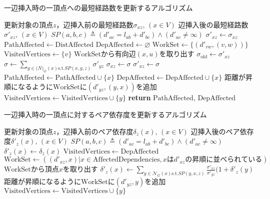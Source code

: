 \begin{algorithm}[H]
  \caption{一辺挿入時の一頂点への最短経路数を更新するアルゴリズム}
  \label{algo:update-sigma-on-insert}
  \begin{algorithmic}[1]
    \Require 更新対象の頂点$z$，辺挿入前の最短経路数$\sigma_{xz},\,(x\in V)$
    \Ensure 辺挿入後の最短経路数$\sigma'_{xz},\,(x\in V)$
    \State $SP(a,b,c)\triangleq(d'_{ac}=l_{ab}+d'_{bc})\land(d'_{ac}\neq\infty)$
    \State $\sigma'_{xz}\gets\sigma_{xz}$
    \State $\mathrm{PathAffected}\gets\mathrm{DistAffected}$
    \State $\mathrm{DepAffected}\gets\varnothing$
    \State $\mathrm{WorkSet}\gets\{(d'_{vw}, (v, w))\}$
    \State $\mathrm{VisitedVertices}\gets\{v\}$
    \State $\mathrm{WorkSet}$から有向辺$(x,u)$を取り出す
    \State $\sigma_{\mathrm{old}}\gets\sigma'_{xz}$
    \State $\sigma\gets\sum_{y\in \mathcal(N)_G(x)\mathrm{s.t.}SP(x,y,z)}\sigma'_{yz}$
    \State $\sigma_{xz}\gets\sigma$
    \State $\sigma'_{xz}\gets\sigma$
    \State $\mathrm{PathAffected}\gets\mathrm{PathAffected}\cup\{x\}$
    \State $\mathrm{DepAffected}\gets\mathrm{DepAffected}\cup\{x\}$
    \State 距離が昇順になるように$\mathrm{WorkSet}$に$(d'_{yz},(y,x))$を追加
    \State $\mathrm{VisitedVertices}\gets\mathrm{VisitedVertices}\cup\{y\}$
    \EndFor
    \EndIf
    \EndWhile
    \State \textbf{return} $\mathrm{PathAffected}$, $\mathrm{DepAffected}$
    \EndProcedure
  \end{algorithmic}
\end{algorithm}

\begin{algorithm}[H]
  \caption{一辺挿入時の一頂点に対するペア依存度を更新するアルゴリズム}
  \label{algo:update-pd-on-insert}
  \begin{algorithmic}[1]
    \Require 更新対象の頂点$z$，辺挿入前のペア依存度$\delta_z(x),\,(x\in V)$
    \Ensure 辺挿入後のペア依存度$\delta'_z(x),\,(x\in V)$
    \State $SP(a,b,c)\triangleq(d'_{ac}=l_{ab}+d'_{bc})\land(d'_{ac}\neq\infty)$
    \State $\delta'_z(x)\gets\delta_z(x)$
    \State $\mathrm{VisitedVertices}\gets\mathrm{DepAffected}$
    \State $\mathrm{WorkSet}\gets((d'_{xz},x)|x\in\mathrm{AffectedDependencies},x\mathrm{は}d'_{xz}\mathrm{の昇順に並べられている})$
    \State $\mathrm{WorkSet}$から頂点$x$を取り出す
    \State $\delta'_z(x)\gets\sum_{y\in\mathcal{N}_G(x)\mathrm{s.t.}SP(y,x,z)}\frac{\sigma'_{xz}}{\sigma'_{yz}}(1+\delta'_z(y)$
    \State 距離が昇順になるように$\mathrm{WorkSet}$に$(d'_{yz},y)$を追加
    \State $\mathrm{VisitedVertices}\gets\mathrm{VisitedVertices}\cup\{y\}$
    \EndFor
    \EndIf
    \EndWhile
    \EndProcedure
  \end{algorithmic}
\end{algorithm}

